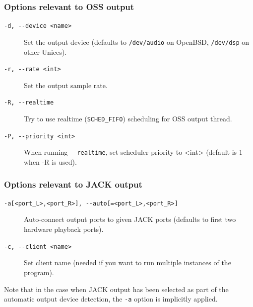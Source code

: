 \documentclass[10pt,english]{article}
\begin{document}
\subsubsection{Options relevant to OSS output\label{idp389104}}

\begin{description}

\item [
\texttt{-d, {-}{-}device <name>}
]

Set the output device (defaults to
\texttt{/dev/audio} on OpenBSD, \texttt{/dev/dsp}
on other Unices).

\item [
\texttt{-r, {-}{-}rate <int>}
]

Set the output sample rate.

\item [
\texttt{-R, {-}{-}realtime}
]

Try to use realtime (\texttt{SCHED\_FIFO}) scheduling
for OSS output thread.

\item [
\texttt{-P, {-}{-}priority <int>}
]

When running \texttt{{-}{-}realtime}, set scheduler
priority to <int> (default is 1 when -R is used).

\end{description}



\subsubsection{Options relevant to JACK output\label{idp396800}}

\begin{description}

\item [
\texttt{-a[<port\_L>,<port\_R>],
{-}{-}auto[=<port\_L>,<port\_R>]}
]

Auto-connect output ports to given JACK ports
(defaults to first two hardware playback ports).

\item [
\texttt{-c, {-}{-}client <name>}
]

Set client name (needed if you want to run multiple
instances of the program).

\end{description}



\noindent Note that in the case when JACK output has been selected
as part of the automatic output device detection, the
\texttt{-a} option is implicitly applied.
\end{document}
